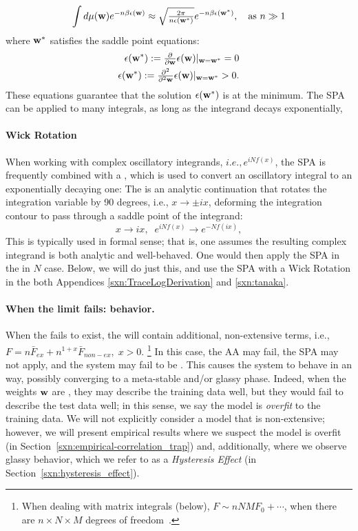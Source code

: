 \begin{align}
  \label{eqn:SPA}
  \int d\mu({\mathbf{w}}) e^{-n\beta\epsilon({\mathbf{w}})}\approx \sqrt{\tfrac{2\pi}{n\epsilon({\mathbf{w}}^{*})}} e^{-n\beta\epsilon({\mathbf{w}}^{*})}  
  , \quad \text{as } n \gg 1
\end{align}
where ${\mathbf{w}}^{*}$ satisfies the saddle point equations:
\begin{align}
  \epsilon({\mathbf{w}}^{*}):=\tfrac{\partial}{\partial {\mathbf{w}}}\epsilon({\mathbf{w}})\vert_{{\mathbf{w}}={\mathbf{w}}^{*}}=0 \\
  \epsilon({\mathbf{w}}^{*}):=\tfrac{\partial^{2}}{\partial^{2} {\mathbf{w}}}\epsilon({\mathbf{w}})\vert_{{\mathbf{w}}={\mathbf{w}}^{*}}>0  .
\end{align}
These equations guarantee that the solution $\epsilon({\mathbf{w}}^{*})$ is at the minimum.
The SPA can be applied to many \LargeN integrals, as long as the integrand decays exponentially,  

\paragraph{Wick Rotation} When working with complex oscillatory integrands, $i.e., e^{iNf(x)}$,   
the SPA is frequently combined with a \emph{\WickRotation}, 
which is used to convert an oscillatory integral to an exponentially decaying one:
The \WickRotation is an analytic continuation that rotates the integration variable by 90 degrees, i.e., $x \to \pm i x$, deforming the integration contour to pass through a saddle point of the integrand:
\begin{equation}
x\rightarrow ix,\;\;e^{iNf(x)}\rightarrow e^{-Nf(ix)},
\end{equation}
This is typically used in formal sense; that is, one assumes the resulting complex integrand is both analytic and well-behaved.
One would then apply the SPA in the \LargeN in $N$ case.
Below, we will do just this, and  use the SPA with a Wick Rotation in the both Appendices \ref{sxn:TraceLogDerivation} and \ref{sxn:tanaka}.

\paragraph{When the \Thermodynamic limit fails: \ATypical behavior.}
When the \ThermodynamicLimit fails to exist, the \FreeEnergy will contain additional, non-extensive terms, i.e.,
$F = n\bar{F}_{ex} + n^{1+x}\bar{F}_{non-ex},\;x>0$.
\footnote{When dealing with matrix integrals (below), $F\sim nNMF_{0}+\cdots$, when there are $n \times N \times M$ degrees
of freedom~\cite{PP95}.}
In this case, the AA may fail, the SPA may not apply, and the system may fail to be \SelfAveraging.
This causes the system to behave in an \ATypical way, 
possibly converging to a meta-stable and/or glassy phase.
Indeed, when the weights ${\mathbf{w}}$ are \emph{\ATypical}, they may describe the training data well, 
but they would fail to describe the test data well; in this sense, we say the model is \emph{overfit} to the training data.
We will not explicitly consider a model that is non-extensive; however, we will
present empirical results where we suspect the model is overfit
(in Section~\ref{sxn:empirical-correlation_trap})
and, additionally, where we observe glassy behavior, which we refer to as a \emph{Hysteresis Effect}
(in Section~\ref{sxn:hysteresis_effect}).


